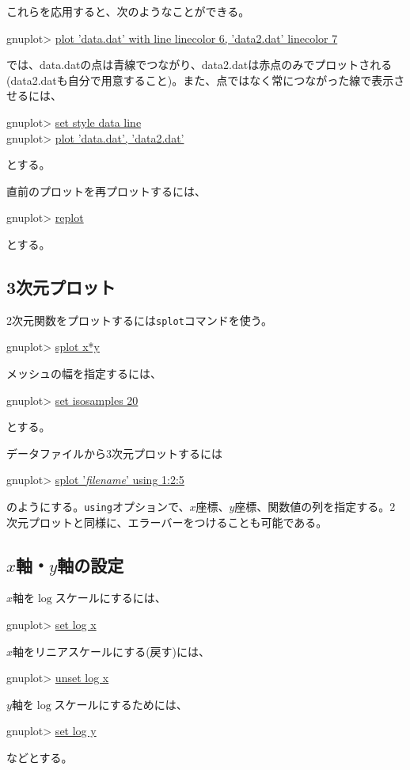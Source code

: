 これらを応用すると、次のようなことができる。
\begin{commandline2}
    gnuplot> \underline{plot 'data.dat' with line linecolor 6, 'data2.dat' linecolor 7}
\end{commandline2} \noindent
では、data.datの点は青線でつながり、data2.datは赤点のみでプロットされる(data2.datも自分で用意すること)。また、点ではなく常につながった線で表示させるには、
\begin{commandline2}
    gnuplot> \underline{set style data line}\\
    gnuplot> \underline{plot 'data.dat', 'data2.dat'}
\end{commandline2} \noindent
とする。

直前のプロットを再プロットするには、
\begin{commandline2}
    gnuplot> \underline{replot}
\end{commandline2} \noindent
とする。

\subsection{3次元プロット}

2次元関数をプロットするには\texttt{splot}コマンドを使う。
\begin{commandline2}
    gnuplot> \underline{splot x*y}
\end{commandline2} \noindent
メッシュの幅を指定するには、
\begin{commandline2}
    gnuplot> \underline{set isosamples 20}
\end{commandline2} \noindent
とする。

データファイルから3次元プロットするには
\begin{commandline2}
    gnuplot> \underline{splot '\textit{filename}' using 1:2:5}
\end{commandline2} \noindent
のようにする。\texttt{using}オプションで、\(x\)座標、\(y\)座標、関数値の列を指定する。2次元プロットと同様に、エラーバーをつけることも可能である。

\subsection{\texorpdfstring{\(x\)軸・\(y\)軸の設定}{x,y軸の設定}}

\(x\)軸を\(\log\)スケールにするには、
\begin{commandline2}
    gnuplot> \underline{set log x}
\end{commandline2} \noindent
\(x\)軸をリニアスケールにする(戻す)には、
\begin{commandline2}
    gnuplot> \underline{unset log x}
\end{commandline2} \noindent
\(y\)軸を\(\log\)スケールにするためには、
\begin{commandline2}
    gnuplot> \underline{set log y}
\end{commandline2} \noindent
などとする。


